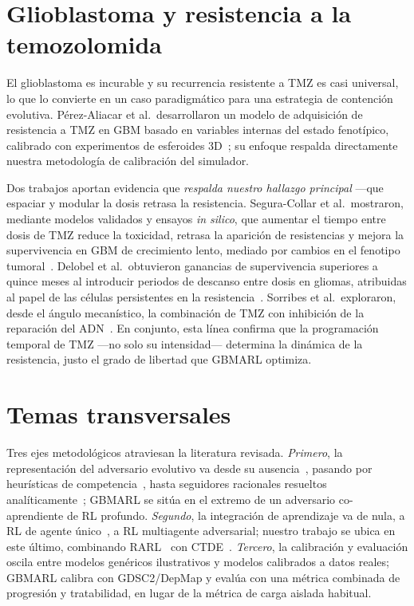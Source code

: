 \section{Glioblastoma y resistencia a la temozolomida}
\label{sec:gbm-tmz}

El glioblastoma es incurable y su recurrencia resistente a TMZ es casi universal, lo que lo convierte en un caso paradigmático para una estrategia de contención evolutiva. Pérez-Aliacar et al.\ desarrollaron un modelo de adquisición de resistencia a TMZ en GBM basado en variables internas del estado fenotípico, calibrado con experimentos de esferoides 3D~\cite{PerezAliacar2024}; su enfoque respalda directamente nuestra metodología de calibración del simulador.

Dos trabajos aportan evidencia que \emph{respalda nuestro hallazgo principal} ---que espaciar y modular la dosis retrasa la resistencia. Segura-Collar et al.\ mostraron, mediante modelos validados y ensayos \emph{in silico}, que aumentar el tiempo entre dosis de TMZ reduce la toxicidad, retrasa la aparición de resistencias y mejora la supervivencia en GBM de crecimiento lento, mediado por cambios en el fenotipo tumoral~\cite{SeguraCollar2022}. Delobel et al.\ obtuvieron ganancias de supervivencia superiores a quince meses al introducir periodos de descanso entre dosis en gliomas, atribuidas al papel de las células persistentes en la resistencia~\cite{Delobel2023}. Sorribes et al.\ exploraron, desde el ángulo mecanístico, la combinación de TMZ con inhibición de la reparación del ADN~\cite{Sorribes2019}. En conjunto, esta línea confirma que la programación temporal de TMZ ---no solo su intensidad--- determina la dinámica de la resistencia, justo el grado de libertad que GBMARL optimiza.

\section{Temas transversales}
\label{sec:transversales}

Tres ejes metodológicos atraviesan la literatura revisada. \emph{Primero}, la representación del adversario evolutivo va desde su ausencia~\cite{Padmanabhan2017,Mashayekhi2023,Gallagher2024}, pasando por heurísticas de competencia~\cite{Gallaher2017,Strobl2020}, hasta seguidores racionales resueltos analíticamente~\cite{Stankova2019,Salvioli2024,Orlando2012}; GBMARL se sitúa en el extremo de un adversario co-aprendiente de RL profundo. \emph{Segundo}, la integración de aprendizaje va de nula, a RL de agente único~\cite{Gallagher2024,Mashayekhi2023}, a RL multiagente adversarial; nuestro trabajo se ubica en este último, combinando RARL~\cite{Pinto2017} con CTDE~\cite{Amato2024}. \emph{Tercero}, la calibración y evaluación oscila entre modelos genéricos ilustrativos y modelos calibrados a datos reales; GBMARL calibra con GDSC2/DepMap y evalúa con una métrica combinada de progresión y tratabilidad, en lugar de la métrica de carga aislada habitual.

